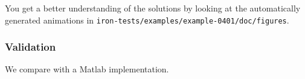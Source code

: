 

You get a better understanding of the solutions by looking at the automatically generated animations in \verb|iron-tests/examples/example-0401/doc/figures|.

%
\subsubsection{Validation}
%
We compare with a Matlab implementation.
%
